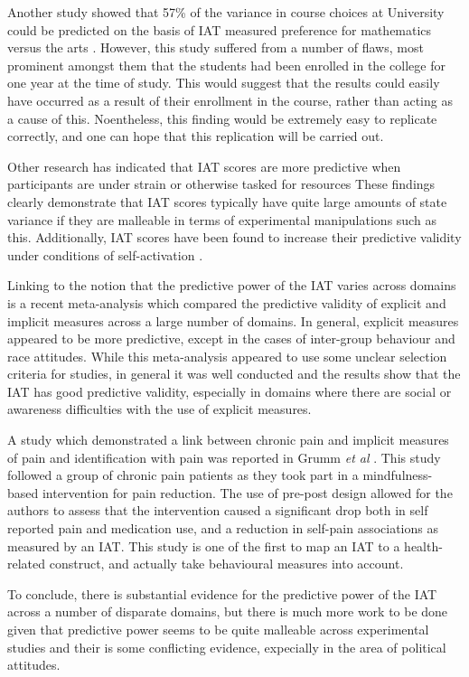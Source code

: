 Another study showed that 57\% of the variance in course choices at University could be predicted on the basis of IAT measured preference for mathematics versus the arts \cite{Perugini2007}. However, this study suffered from a number of flaws, most prominent amongst them that the students had been enrolled in the college for one year at the time of study. This would suggest that the results could easily have occurred as a result of their enrollment in the course, rather than acting as a cause of this. Noentheless, this finding would be extremely easy to replicate correctly, and one can hope that this replication will be carried out. 

Other research has indicated that IAT scores are more predictive when participants are under strain or otherwise tasked for resources \cite{Hofmann2008a} These findings clearly demonstrate that IAT scores typically have quite large amounts of state variance if they are malleable in terms of experimental manipulations such as this.  Additionally, IAT scores have been found to increase their predictive validity under conditions of self-activation \cite{Perugini2007}. 

Linking to the notion that the predictive power of the IAT varies across domains is a recent meta-analysis \cite{Greenwald2009} which compared the predictive validity of explicit and implicit measures across a large number of domains. In general, explicit measures appeared to be more predictive, except in the cases of inter-group behaviour and race attitudes. While this meta-analysis appeared to use some unclear selection criteria for studies, in general it was well conducted and the results show that the IAT has good predictive validity, especially in domains where there are social or awareness difficulties with the use of explicit measures.  

A study which demonstrated a link between chronic pain and implicit measures of pain and identification with pain was reported in Grumm \textit{et al} \cite{Grumm2008}. This study followed a group of chronic pain patients as they took part in a mindfulness-based intervention for pain reduction. The use of pre-post design allowed for the authors to assess that the intervention caused a significant drop both in self reported pain and medication use, and a reduction in self-pain associations as measured by an IAT. This study is one of the first to map an IAT to a health-related construct, and actually take behavioural measures into account. 

To conclude, there is substantial evidence for the predictive power of the IAT across a number of disparate domains, but there is much more work to be done given that predictive power seems to be quite malleable across experimental studies and their is some conflicting evidence, expecially in the area of political attitudes. 

